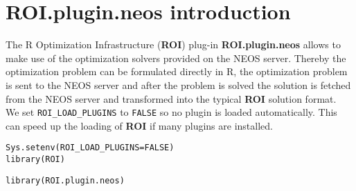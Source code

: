 \documentclass[a4paper]{article}\usepackage[]{graphicx}\usepackage[]{color}
\makeatletter
\newcommand{\hlnum}[1]{\textcolor[rgb]{0,0,0}{#1}}%
\newcommand{\hlstd}[1]{\textcolor[rgb]{0,0,0}{#1}}%
\newcommand{\hlkwc}[1]{\textcolor[rgb]{0,0,1}{#1}}%
\newcommand{\hlkwd}[1]{\textcolor[rgb]{0,0,0}{#1}}%
\newenvironment{kframe}{%
 \def\at@end@of@kframe{}%
 \ifinner\ifhmode%
  \def\at@end@of@kframe{\end{minipage}}%
  \begin{minipage}{\columnwidth}%
 \fi\fi%
 \def\FrameCommand##1{\hskip\@totalleftmargin \hskip-\fboxsep
 \colorbox{shadecolor}{##1}\hskip-\fboxsep
     \hskip-\linewidth \hskip-\@totalleftmargin \hskip\columnwidth}%
 \MakeFramed {\advance\hsize-\width
   \@totalleftmargin\z@ \linewidth\hsize
   \@setminipage}}%
 {\par\unskip\endMakeFramed%
 \at@end@of@kframe}
\newenvironment{knitrout}{}{} %
\newcommand{\pkg}[1]{\textbf{#1}}
\newcommand{\proglang}[1]{\textsf{#1}}
\newcommand{\code}[1]{\texttt{#1}}
\makeatother
\begin{document}
\section{\pkg{ROI.plugin.neos} introduction}
The R Optimization Infrastructure (\pkg{ROI}) plug-in \pkg{ROI.plugin.neos}
allows to make use of the optimization solvers provided on the NEOS server.
Thereby the optimization problem can be formulated directly in \proglang{R},
the optimization problem is sent to the NEOS server and after the 
problem is solved the solution is fetched from the NEOS server and
transformed into the typical \pkg{ROI} solution format. \\

We set \verb+ROI_LOAD_PLUGINS+ to \code{FALSE} so no plugin is loaded 
automatically. This can speed up the loading of \pkg{ROI} if many plugins 
are installed.

\begin{knitrout}
\color{fgcolor}\begin{kframe}
\begin{alltt}
\hlkwd{Sys.setenv}\hlstd{(}\hlkwc{ROI_LOAD_PLUGINS} \hlstd{=} \hlnum{FALSE}\hlstd{)}
\hlkwd{library}\hlstd{(ROI)}
\end{alltt}


{\ttfamily\noindent\itshape\color{messagecolor}{\#\# ROI: R Optimization Infrastructure}}

{\ttfamily\noindent\itshape\color{messagecolor}{\#\# Registered solver plugins: nlminb.}}

{\ttfamily\noindent\itshape\color{messagecolor}{\#\# Default solver: auto.}}\begin{alltt}
\hlkwd{library}\hlstd{(ROI.plugin.neos)}
\end{alltt}
\end{kframe}
\end{knitrout}
\end{document}
